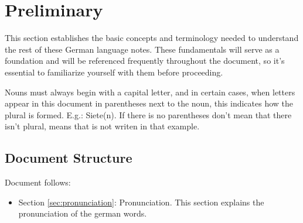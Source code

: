 \section{Preliminary}\label{sec:preliminary}

This section establishes the basic concepts and terminology needed to understand the rest of these German language notes. These fundamentals will serve as a foundation and will be referenced frequently throughout the document, so it's essential to familiarize yourself with them before proceeding.

Nouns must always begin with a capital letter, and in certain cases, when letters appear in this document in parentheses next to the noun, this indicates how the plural is formed. E.g.: Siete(n). If there is no parentheses don't mean that there isn't plural, means that is not writen in that example. 

\subsection{Document Structure}

Document follows:

\begin{itemize}
    \item Section \ref{sec:pronunciation}: Pronunciation. This section explains the pronunciation of the german words.
\end{itemize}